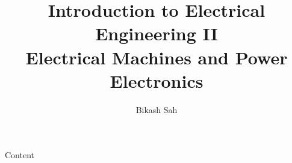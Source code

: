 \documentclass{../course_template/lectureClass}
\begin{document}

\title[Introduction to Electrical Engineering II]{Introduction to Electrical Engineering II \\ Electrical Machines and Power Electronics}
\author{Bikash Sah}
\date{}
\begin{frame}[plain]
    \titlepage
\end{frame}

\begin{frame}{Content}
    \tableofcontents
\end{frame}


%

\end{document}
